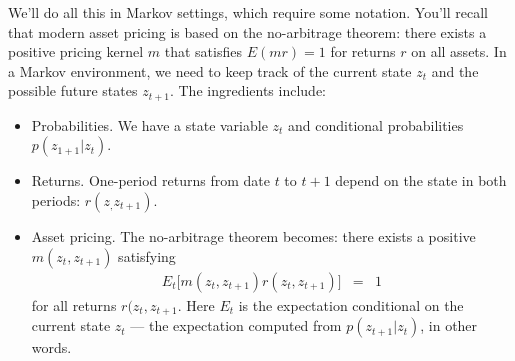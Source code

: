 \documentclass[11pt]{article}
\begin{document}
We'll do all this in Markov settings, which require some notation.
You'll recall that modern asset pricing is based on the no-arbitrage theorem:
there exists a positive pricing kernel $m$ that satisfies
$ E(mr) = 1$ for returns $r$ on all assets.
In a Markov environment, we need to keep track of the current state $z_t$
and the possible future states $z_{t+1}$.
The ingredients include:
%
\begin{itemize}
\item Probabilities.  We have a state variable $z_t$ and conditional probabilities
$ p(z_{1+1} | z_t) $.
\item Returns.  One-period returns from date $t$ to $t+1$ depend
on the state in both periods:  $r(z_,z_{t+1})$.
\item Asset pricing.  The no-arbitrage theorem becomes:  there exists a positive $m(z_t,z_{t+1})$
satisfying
\begin{eqnarray*}
    E_t \big[ m(z_t,z_{t+1}) r(z_t,z_{t+1}) \big] &=& 1
\end{eqnarray*}
for all returns $ r(z_t,z_{t+1} $.
Here $E_t$ is the expectation conditional on the current state $z_t$
--- the expectation computed from $p(z_{t+1} | z_t)$, in other words.
\end{itemize}
\end{document}
